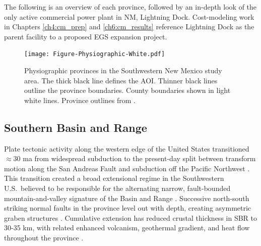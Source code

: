 The following is an overview of each province, followed by an in-depth look of the only active commercial power plant in NM, Lightning Dock. Cost-modeling work in Chapters \ref{ch4:cm_prep} and \ref{ch6:cm_results} reference Lightning Dock as the parent facility to a proposed EGS expansion project.

\begin{figure}
\centering
\texttt{[image: Figure-Physiographic-White.pdf]}
\caption[Physiographic provinces of SW New Mexico]{Physiographic provinces in the Southwestern New Mexico study area. The thick black line defines the AOI. Thinner black lines outline the province boundaries. County boundaries shown in light white lines. Province outlines from \protect\citep[~Figure 2-2]{bielicki_hydrogeolgic_2015}.}
\label{fig:phys-provinces}
\end{figure}

\subsection{Southern Basin and Range}\label{ch2:sbr_province}
Plate tectonic activity along the western edge of the United States transitioned $\approx$30 \acrshort{ma} from widespread subduction to the present-day split between transform motion along the San Andreas Fault and subduction off the Pacific Northwest \citep[p.\ 81]{fowler_solid_2005}. This transition created a broad extensional regime in the Southwestern U.S.\ believed to be responsible for the alternating narrow, fault-bounded mountain-and-valley signature of the Basin and Range \citep{henry_real_1992}. Successive north-south striking normal faults in the province level out with depth, creating asymmetric graben structures \citep[p.\ 28-29]{frisch_continental_2011}. Cumulative extension has reduced crustal thickness in SBR to 30-35 km, with related enhanced volcanism, geothermal gradient, and heat flow throughout the province \citep{lerch_crustal_2007}.


